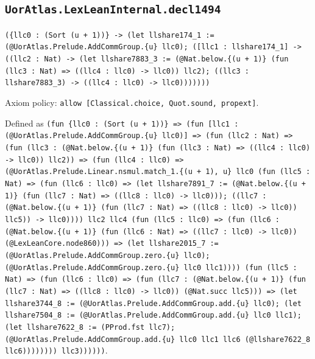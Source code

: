 \documentclass[11pt]{article}
\begin{document}
\subsection*{\texttt{UorAtlas.LexLeanInternal.decl1494}}
\noindent\texttt{(\{llc0 : (Sort (u + 1))\} -> (let llshare174\_1 := (@UorAtlas.Prelude.AddCommGroup.\{u\} llc0); ([llc1 : llshare174\_1] -> ((llc2 : Nat) -> (let llshare7883\_3 := (@Nat.below.\{(u + 1)\} (fun (llc3 : Nat) => ((llc4 : llc0) -> llc0)) llc2); ((llc3 : llshare7883\_3) -> ((llc4 : llc0) -> llc0)))))))}\par
\noindent Axiom policy: \texttt{allow [Classical.choice, Quot.sound, propext]}.\par
\noindent Defined as \texttt{(fun \{llc0 : (Sort (u + 1))\} => (fun [llc1 : (@UorAtlas.Prelude.AddCommGroup.\{u\} llc0)] => (fun (llc2 : Nat) => (fun (llc3 : (@Nat.below.\{(u + 1)\} (fun (llc3 : Nat) => ((llc4 : llc0) -> llc0)) llc2)) => (fun (llc4 : llc0) => (@UorAtlas.Prelude.Linear.nsmul.match\_1.\{(u + 1), u\} llc0 (fun (llc5 : Nat) => (fun (llc6 : llc0) => (let llshare7891\_7 := (@Nat.below.\{(u + 1)\} (fun (llc7 : Nat) => ((llc8 : llc0) -> llc0))); ((llc7 : (@Nat.below.\{(u + 1)\} (fun (llc7 : Nat) => ((llc8 : llc0) -> llc0)) llc5)) -> llc0)))) llc2 llc4 (fun (llc5 : llc0) => (fun (llc6 : (@Nat.below.\{(u + 1)\} (fun (llc6 : Nat) => ((llc7 : llc0) -> llc0)) (@LexLeanCore.node860))) => (let llshare2015\_7 := (@UorAtlas.Prelude.AddCommGroup.zero.\{u\} llc0); (@UorAtlas.Prelude.AddCommGroup.zero.\{u\} llc0 llc1)))) (fun (llc5 : Nat) => (fun (llc6 : llc0) => (fun (llc7 : (@Nat.below.\{(u + 1)\} (fun (llc7 : Nat) => ((llc8 : llc0) -> llc0)) (@Nat.succ llc5))) => (let llshare3744\_8 := (@UorAtlas.Prelude.AddCommGroup.add.\{u\} llc0); (let llshare7504\_8 := (@UorAtlas.Prelude.AddCommGroup.add.\{u\} llc0 llc1); (let llshare7622\_8 := (PProd.fst llc7); (@UorAtlas.Prelude.AddCommGroup.add.\{u\} llc0 llc1 llc6 (@llshare7622\_8 llc6)))))))) llc3))))))}.\par
\end{document}
